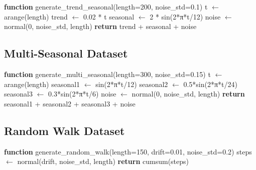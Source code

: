 \documentclass[11pt]{article}
\begin{document}
\begin{algorithmic}
\STATE \textbf{function} generate\_trend\_seasonal(length=200, noise\_std=0.1)
\STATE \quad t $\leftarrow$ arange(length)
\STATE \quad trend $\leftarrow$ 0.02 * t 
\STATE \quad seasonal $\leftarrow$ 2 * sin(2*π*t/12) 
\STATE \quad noise $\leftarrow$ normal(0, noise\_std, length)
\STATE \quad \textbf{return} trend + seasonal + noise
\end{algorithmic}

\subsection{Multi-Seasonal Dataset}

\begin{algorithmic}
\STATE \textbf{function} generate\_multi\_seasonal(length=300, noise\_std=0.15)
\STATE \quad t $\leftarrow$ arange(length)
\STATE \quad seasonal1 $\leftarrow$ sin(2*π*t/12) 
\STATE \quad seasonal2 $\leftarrow$ 0.5*sin(2*π*t/24) 
\STATE \quad seasonal3 $\leftarrow$ 0.3*sin(2*π*t/6) 
\STATE \quad noise $\leftarrow$ normal(0, noise\_std, length)
\STATE \quad \textbf{return} seasonal1 + seasonal2 + seasonal3 + noise
\end{algorithmic}

\subsection{Random Walk Dataset}

\begin{algorithmic}
\STATE \textbf{function} generate\_random\_walk(length=150, drift=0.01, noise\_std=0.2)
\STATE \quad steps $\leftarrow$ normal(drift, noise\_std, length)
\STATE \quad \textbf{return} cumsum(steps)
\end{algorithmic}
\end{document}
